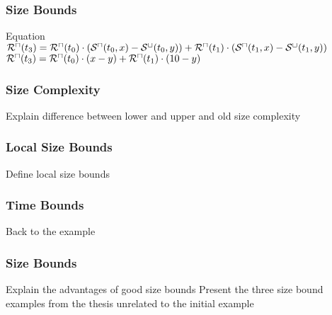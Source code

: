 \documentclass{beamer}
\begin{document}
\begin{frame}
  \frametitle{Size Bounds}
  \begin{figure}
    \centering
  \end{figure}
  \begin{block}{Equation}
    ${\mathcal{R}^\sqcap}(t_3) = {\mathcal{R}^\sqcap}(t_0) \cdot ({\mathcal{S}^\sqcap}(t_0,x)-{\mathcal{S}^\sqcup}(t_0,y)) + {\mathcal{R}^\sqcap}(t_1) \cdot ({\mathcal{S}^\sqcap}(t_1,x)-{\mathcal{S}^\sqcup}(t_1,y))$ \\
    ${\mathcal{R}^\sqcap}(t_3) = {\mathcal{R}^\sqcap}(t_0) \cdot (x-y) + {\mathcal{R}^\sqcap}(t_1) \cdot (10-y)$
  \end{block}
\end{frame}

\begin{frame}
  \frametitle{Size Complexity}
  Explain difference between lower and upper and old size complexity
\end{frame}

\begin{frame}
  \frametitle{Local Size Bounds}
  Define local size bounds
\end{frame}

\begin{frame}
  \frametitle{Time Bounds}
  Back to the example
\end{frame}

\begin{frame}
  \frametitle{Size Bounds}
  Explain the advantages of good size bounds
  Present the three size bound examples from the thesis unrelated to the initial example
\end{frame}
\end{document}
